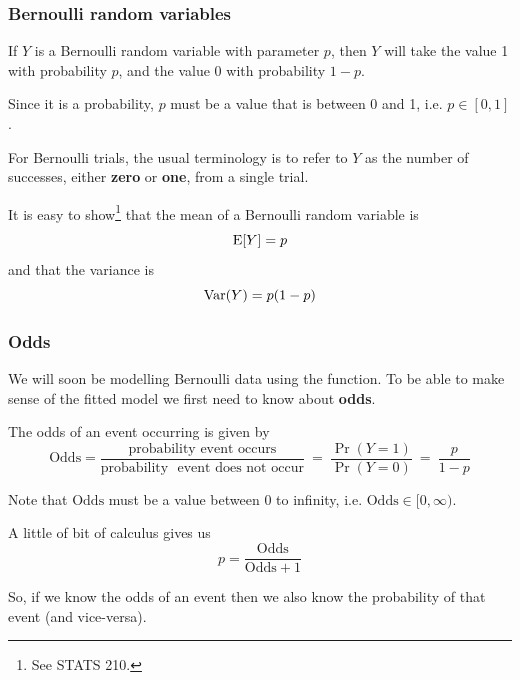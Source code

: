 \documentclass{beamer}\usepackage[]{graphicx}\usepackage[]{xcolor}
\begin{document}
\begin{frame}
\frametitle{Bernoulli random variables}
If $Y$ is a Bernoulli random variable with parameter $p$, then $Y$ will take the value 1 with probability $p$, and the value 0 with probability $1-p$. %

\medskip

Since it is a probability, $p$ must be a value that is between 0 and 1, i.e. $p \in [0, 1]$.

\medskip \medskip

For Bernoulli trials, the usual terminology is to refer to $Y$ as the
number of successes, either \textbf{zero} or \textbf{one}, from a single trial. 
\bigskip

It is easy to show\footnote{See STATS 210.} that the mean of a Bernoulli random variable is
\[
\operatorname{E}[Y]=p
\]
and that the variance is
\[
\operatorname*{Var}(Y)=p (1-p)
\]

\end{frame}


\begin{frame}
\frametitle{Odds}
We will soon be modelling Bernoulli data using the  function. To be able to make sense of the fitted model we first need to know about {\bf odds}. 

The odds of an event occurring is given by
\[
\text{Odds} = \frac{\text{probability~event~occurs}}{\text{probability ~event~does~not~occur}}~=~\frac{\Pr(Y=1)}{\Pr(Y=0)}~ = ~\frac{p}{1-p}
\]

Note that $\text{Odds}$ must be a value between 0 to infinity, i.e. $\text{Odds} \in [0, \infty)$.
\medskip \medskip 

A little of bit of calculus gives us 
\[
p = \frac{\text{Odds}}{\text{Odds}+1}
\]

So, if we know the odds of an event then we also know the probability of that event (and vice-versa).
\end{frame}
\end{document}
